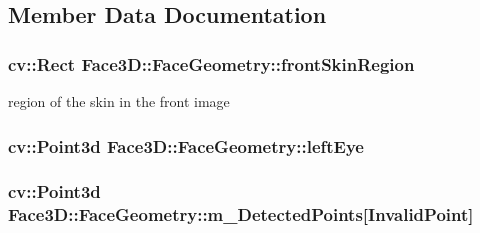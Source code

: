 \subsection{Member Data Documentation}
\subsubsection[{\texorpdfstring{front\+Skin\+Region}{frontSkinRegion}}]{\setlength{\rightskip}{0pt plus 5cm}cv\+::\+Rect Face3\+D\+::\+Face\+Geometry\+::front\+Skin\+Region\hspace{0.3cm}{\ttfamily [private]}}\hypertarget{class_face3_d_1_1_face_geometry_aec3c5ac2a67745348df5aa68651bf616}{}\label{class_face3_d_1_1_face_geometry_aec3c5ac2a67745348df5aa68651bf616}


region of the skin in the front image 

\subsubsection[{\texorpdfstring{left\+Eye}{leftEye}}]{\setlength{\rightskip}{0pt plus 5cm}cv\+::\+Point3d Face3\+D\+::\+Face\+Geometry\+::left\+Eye\hspace{0.3cm}{\ttfamily [private]}}\hypertarget{class_face3_d_1_1_face_geometry_a67446b08935c867d465743452d674f71}{}\label{class_face3_d_1_1_face_geometry_a67446b08935c867d465743452d674f71}
\subsubsection[{\texorpdfstring{m\+\_\+\+Detected\+Points}{m_DetectedPoints}}]{\setlength{\rightskip}{0pt plus 5cm}cv\+::\+Point3d Face3\+D\+::\+Face\+Geometry\+::m\+\_\+\+Detected\+Points\mbox{[}{\bf Invalid\+Point}\mbox{]}\hspace{0.3cm}{\ttfamily [private]}}\hypertarget{class_face3_d_1_1_face_geometry_a695d2f7b17ed80f56f4e6af44c796a9a}{}\label{class_face3_d_1_1_face_geometry_a695d2f7b17ed80f56f4e6af44c796a9a}


